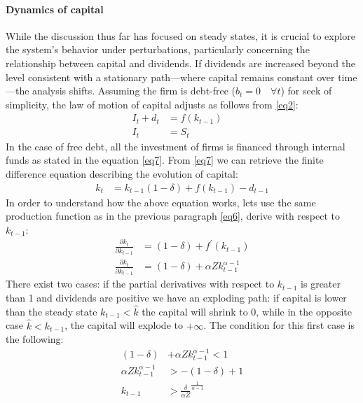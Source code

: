 \documentclass[12pt]{article}
\begin{document}
\paragraph{Dynamics of capital}
While the discussion thus far has focused on steady states, it is crucial to explore the system's behavior under
perturbations,  particularly concerning the relationship between capital and dividends. If dividends are increased
beyond the level consistent with a stationary path—where capital remains constant over time—the analysis shifts.
Assuming the firm is debt-free (\(b_t = 0 \quad \forall t\)) for seek of simplicity, the law of motion of capital adjusts
as follows from \ref{eq2}:
\begin{align*}
    I_t + d_t &= f\left(k_{t-1}\right) \quad \\
    I_t &= S_t \tag{7} \label{eq7}
\end{align*}
In the case of free debt, all the investment of firms is financed through internal funds as stated in the equation
\ref{eq7}. From \ref{eq7} we can retrieve the finite difference equation describing the evolution of capital:
\begin{align*}
    k_{t} &= k_{t-1} (1-\delta) + f\left(k_{t-1}\right) - d_{t-1}
\end{align*}
In order to understand how the above equation works, lets use the same production function as in the previous paragraph
\ref{eq6}, derive with respect to \(k_{t-1}\):
\begin{align*}
    \frac{\partial{k_t}}{\partial k_{t-1}} &= \left(1-\delta\right) + f^{\prime}\left(k_{t-1}\right) \\
    \frac{\partial{k_t}}{\partial k_{t-1}} &= \left(1-\delta\right) + \alpha Z k^{\alpha-1}_{t-1} \tag{8} \label{eq8}
\end{align*}
There exist two cases:
if the partial derivatives with respect to \(k_{t-1}\) is greater than 1 and dividends are positive we have an exploding
path: if capital is lower than the steady state \(k_{t-1} < \widehat{k}\) the capital will shrink to 0, while in the
opposite case \(\widehat{k} < k_{t-1}\), the capital will explode to \(+\infty\). The condition for this first case is
the following:
\begin{align*}
    \left(1-\delta\right) &+ \alpha Z k^{\alpha-1}_{t-1} < 1 \\
    \alpha Z k^{\alpha-1}_{t-1} &> - \left(1-\delta\right) +1 \\
    k_{t-1} &> {\frac{\delta}{\alpha Z}}^{\frac{1}{\alpha - 1}} \tag{9} \label{eq9}
\end{align*}
\end{document}
